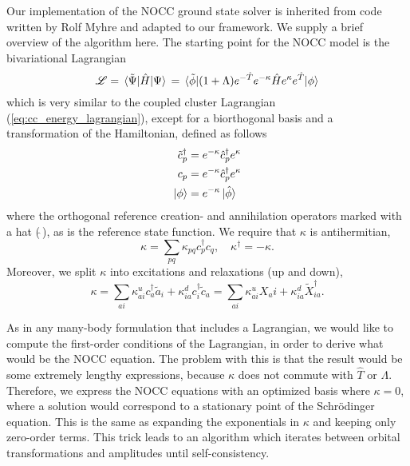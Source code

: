     Our implementation of the NOCC ground state solver is inherited from code written by Rolf Myhre and 
    adapted to our 
    framework. We supply a brief overview of the algorithm here. The starting point for the 
    NOCC model is the bivariational Lagrangian
    \begin{equation}
        \label{eq:nocc_lagrangian}
        \mathscr{L} = \mel*{\tilde{\Psi}}{\hat{H}}{\Psi} \\
            = \mel*{\tilde{\phi}}
                {
                (1 + \Lambda) e^{-\hat{T}}e^{-\kappa}\hat{H}e^{\kappa}e^{\hat{T}}
                }{\phi}
    \end{equation}
    which is very similar to the coupled cluster Lagrangian (\autoref{eq:cc_energy_lagrangian}),
    except for a biorthogonal basis and a transformation of the Hamiltonian, defined 
    as follows
    \begin{equation}
        \begin{aligned}
            \tilde{c}_p^\dagger &= e^{-\kappa}\hat{c}_p^\dagger e^\kappa \\
            c_p &= e^{-\kappa} \hat{c}_p^\dagger e^\kappa \\
            \ket{\phi} &= e^{-\kappa}\ket*{\hat{\phi}}
        \end{aligned}
    \end{equation}
    where the orthogonal reference creation- and annihilation operators marked with a hat
    ($\hat{\ }$), as is the reference state function. We require that $\kappa$ is antihermitian,
    \begin{equation}
        \kappa = \sum_{pq} \kappa_{pq}c^\dagger_p c_q, \quad \kappa^\dagger = -\kappa.
    \end{equation}
    Moreover, we split $\kappa$ into excitations and relaxations (up and down),
    \begin{equation}
        \label{eq:agg_kappa}
        \kappa = \sum_{ai} \kappa^u_{ai}c^\dagger_a \tilde{a}_i
            + \kappa^d_{ia} c^\dagger_i \tilde{c}_a
            = \sum_{ai} \kappa^u_{ai} X_ai + \kappa^d_{ia} \tilde{X}^\dagger_{ia}.
    \end{equation} 
    
    As in any many-body formulation that includes a Lagrangian, we would like to compute 
    the first-order conditions of the Lagrangian, in order to derive what would be the 
    NOCC equation. The problem with this is that the result would be some extremely 
    lengthy expressions, because $\kappa$ does not commute with $\hat{T}$ or $\Lambda$.
    Therefore, we express the NOCC equations with an optimized basis where $\kappa=0$,
    where a solution would correspond to a stationary point of the Schrödinger equation.
    This is the same as expanding the exponentials in $\kappa$ and keeping only zero-order 
    terms. This trick leads to an algorithm which iterates between orbital transformations 
    and amplitudes until self-consistency.

